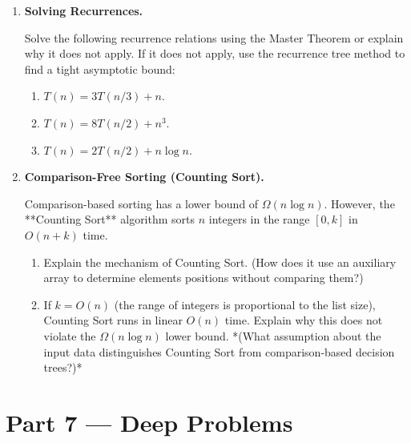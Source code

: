 \documentclass[12pt, a4paper]{book}
\begin{document}
\begin{problembox}
\begin{enumerate}[label=\textbf{P\arabic*.}]
  \item \textbf{Solving Recurrences.}
  
        Solve the following recurrence relations using the Master Theorem or explain why it does not apply. If it does not apply, use the recurrence tree method to find a tight asymptotic bound:
        \begin{enumerate}[label=(\alph*)]
          \item $T(n) = 3 T(n/3) + n$.
          \item $T(n) = 8 T(n/2) + n^3$.
          \item $T(n) = 2 T(n/2) + n \log n$.
        \end{enumerate}

  \item \textbf{Comparison-Free Sorting (Counting Sort).}
  
        Comparison-based sorting has a lower bound of $\Omega(n \log n)$.
        However, the **Counting Sort** algorithm sorts $n$ integers in the range $[0, k]$ in $O(n + k)$ time.
        \begin{enumerate}[label=(\alph*)]
          \item Explain the mechanism of Counting Sort. (How does it use an auxiliary array to determine elements positions without comparing them?)
          \item If $k = O(n)$ (the range of integers is proportional to the list size), Counting Sort runs in linear $O(n)$ time.
                Explain why this does not violate the $\Omega(n \log n)$ lower bound.
                *(What assumption about the input data distinguishes Counting Sort from comparison-based decision trees?)*
        \end{enumerate}
\end{enumerate}
\end{problembox}

\newpage

\section{Part 7 --- Deep Problems}
\end{document}
